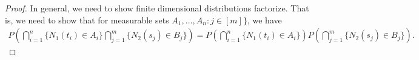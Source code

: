 \documentclass[a4paper,10pt,english]{article}
\begin{document}
\begin{proof}
In general, we need to show finite dimensional distributions factorize. That is, we need to show that for measurable sets $A_1, \hdots, A_n: j \in [m]\}$, we have \begin{align*}
   P\left(\bigcap_{i=1}^n\{N_{1}(t_{i})\in A_{i}\}\bigcap_{j=1}^m\{N_{2}(s_{j})\in B_{j}\}\right)
   =P\left(\bigcap_{i=1}^n\{N_{1}(t_{i})\in A_{i}\}\right)P\left(\bigcap_{j=1}^m\{N_{2}(s_{j})\in B_{j}\}\right).
\end{align*}
\end{proof}

\appendix
\end{document}
